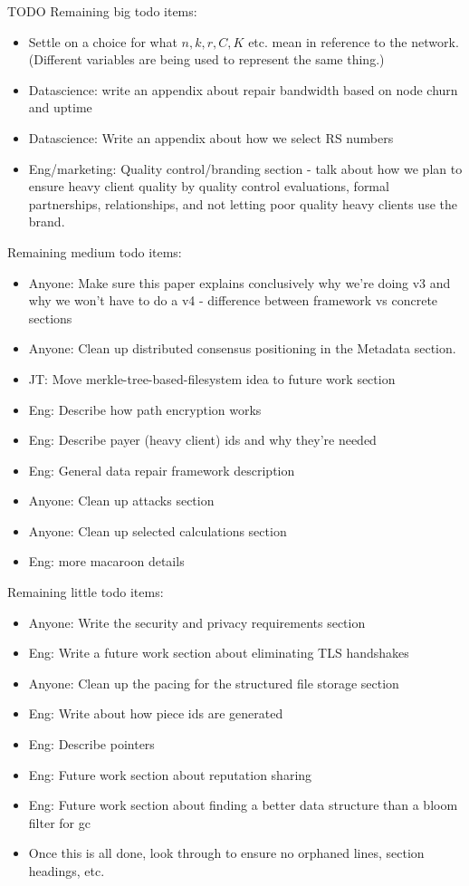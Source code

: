 \documentclass[a4paper,10pt]{article} \usepackage[utf8]{inputenc}
\newcommand{\todo}[1]{{\color{red} TODO #1 }}
\begin{document}
\todo{
Remaining big todo items:
\begin{itemize}
\item Settle on a choice for what $n,k,r,C,K$ etc. mean in reference to the 
network. (Different variables are being used to represent the same thing.)
\item Datascience: write an appendix about repair bandwidth based on node
  churn and uptime
\item Datascience: Write an appendix about how we select RS numbers
\item Eng/marketing: Quality control/branding section - talk about how we
  plan to ensure heavy client quality by quality control evaluations, formal
  partnerships, relationships, and not letting poor quality heavy clients
  use the brand.
\end{itemize}

Remaining medium todo items:
\begin{itemize}
\item Anyone: Make sure this paper explains conclusively why we're doing v3 and
  why we won't have to do a v4 - difference between framework vs concrete
  sections
\item Anyone:
  Clean up distributed consensus positioning in the Metadata section.
\item JT: Move merkle-tree-based-filesystem idea to future work section
\item Eng: Describe how path encryption works
\item Eng: Describe payer (heavy client) ids and why they're needed
\item Eng: General data repair framework description
\item Anyone: Clean up attacks section
\item Anyone: Clean up selected calculations section
\item Eng: more macaroon details
\end{itemize}

Remaining little todo items:
\begin{itemize}
\item Anyone: Write the security and privacy requirements section
\item Eng: Write a future work section about eliminating TLS handshakes
\item Anyone: Clean up the pacing for the structured file storage section
\item Eng: Write about how piece ids are generated
\item Eng: Describe pointers
\item Eng: Future work section about reputation sharing
\item Eng: Future work section about finding a better data structure than
 a bloom filter for gc
\item Once this is all done, look through to ensure no orphaned lines, 
section headings, etc.
\end{itemize}
}
\end{document}
